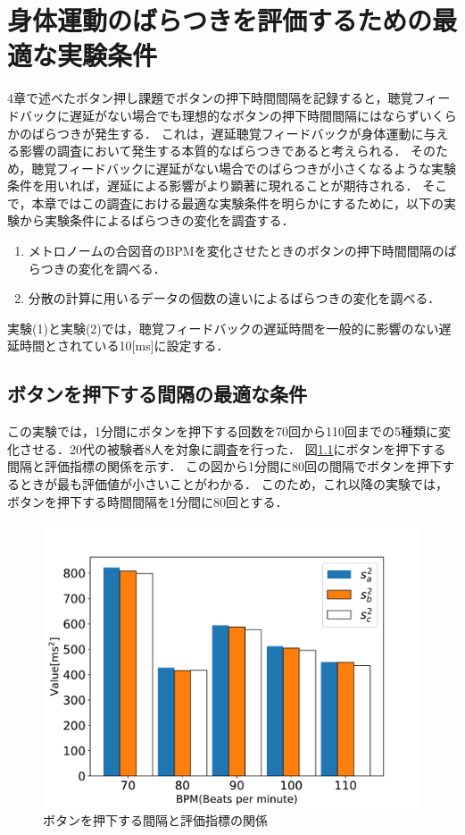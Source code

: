 \chapter{身体運動のばらつきを評価するための最適な実験条件}
4章で述べたボタン押し課題でボタンの押下時間間隔を記録すると，聴覚フィードバックに遅延がない場合でも理想的なボタンの押下時間間隔にはならずいくらかのばらつきが発生する．
これは，遅延聴覚フィードバックが身体運動に与える影響の調査において発生する本質的なばらつきであると考えられる．
そのため，聴覚フィードバックに遅延がない場合でのばらつきが小さくなるような実験条件を用いれば，遅延による影響がより顕著に現れることが期待される．
そこで，本章ではこの調査における最適な実験条件を明らかにするために，以下の実験から実験条件によるばらつきの変化を調査する．
\begin{enumerate}[leftmargin=*, label=実験(\arabic*)] %
  \item メトロノームの合図音のBPMを変化させたときのボタンの押下時間間隔のばらつきの変化を調べる．
  \item 分散の計算に用いるデータの個数の違いによるばらつきの変化を調べる．
\end{enumerate}
実験(1)と実験(2)では，聴覚フィードバックの遅延時間を一般的に影響のない遅延時間とされている10[ms]に設定する．
\section{ボタンを押下する間隔の最適な条件}
この実験では，1分間にボタンを押下する回数を70回から110回までの5種類に変化させる．20代の被験者8人を対象に調査を行った．
図\ref{fig:bpm}にボタンを押下する間隔と評価指標の関係を示す．
この図から1分間に80回の間隔でボタンを押下するときが最も評価値が小さいことがわかる．
このため，これ以降の実験では，ボタンを押下する時間間隔を1分間に80回とする．
\begin{figure}[b]
  \centering
  \includegraphics[scale=0.6]{figures/Yobi/Var/BPM-Change-Var.pdf}
  \caption{ボタンを押下する間隔と評価指標の関係}
  \label{fig:bpm}
\end{figure}
